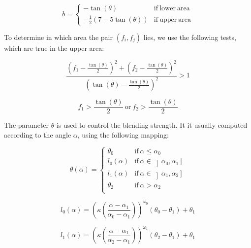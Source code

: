 \documentclass[a4paper,10pt]{article}
\begin{document}
\begin{multicols}{2}
\begin{equation*}
b = \left\{ \begin{array}{ll}
  -\tan(\theta) & \mathrm{if\ lower\ area} \\
  -\frac{1}{2} (7 - 5\tan(\theta)) & \mathrm{if\ upper\ area}
\end{array} \right.
\end{equation*}

To determine in which area the pair $(f_i, f_j)$ lies, we use the following tests, which are true in the upper area:

\begin{equation*}
\frac{\left( f_1 - \frac{\tan(\theta)}{2} \right)^2 + \left( f_2 - \frac{\tan(\theta)}{2} \right)^2}{\left( \tan(\theta) - \frac{\tan(\theta)}{2} \right)^2} > 1
\end{equation*}

\begin{equation*}
f_1 > \frac{\tan(\theta)}{2}\mathrm{\ or\ }f_2 > \frac{\tan(\theta)}{2}
\end{equation*}

The parameter $\theta$ is used to control the blending strength.
It it usually computed according to the angle $\alpha$, using the following mapping:

\begin{equation*}
\theta(\alpha) = \left\{\begin{array}{ll}
  \theta_0 & \mathrm{if\ }\alpha \leq \alpha_0 \\
  l_0(\alpha) & \mathrm{if\ }\alpha \in \left] \alpha_0, \alpha_1 \right] \\
  l_1(\alpha) & \mathrm{if\ }\alpha \in \left] \alpha_1, \alpha_2 \right] \\
  \theta_2 & \mathrm{if\ }\alpha > \alpha_2 \\
\end{array}\right.
\end{equation*}

\begin{equation*}
l_0(\alpha) = \left( \kappa \left(\frac{\alpha - \alpha_1}{\alpha_0 - \alpha_1}\right)\right)^{\omega_0} (\theta_0 - \theta_1) + \theta_1
\end{equation*}

\begin{equation*}
l_1(\alpha) = \left( \kappa \left(\frac{\alpha - \alpha_1}{\alpha_2 - \alpha_1}\right)\right)^{\omega_1} (\theta_2 - \theta_1) + \theta_1
\end{equation*}


\end{multicols}
\end{document}
